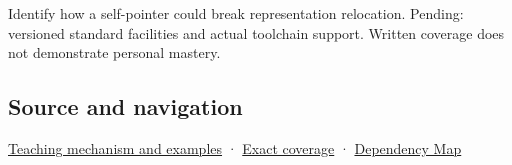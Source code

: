 Identify how a self-pointer could break representation relocation. Pending: versioned standard facilities and actual toolchain support. Written coverage does not demonstrate personal mastery.

\subsection{Source and navigation}\label{appendix-adfd6397af8d-source-and-navigation}

\hyperref[01-foundations-i-ch003-from-three-repairs-to-five-decisions-to-zero-boilerplate]{Teaching mechanism and examples} · \hyperref[appendix-fd090d982a15-m009---parts-127-147]{Exact coverage} · \hyperref[appendix-4ad47bdd269a]{Dependency Map}
